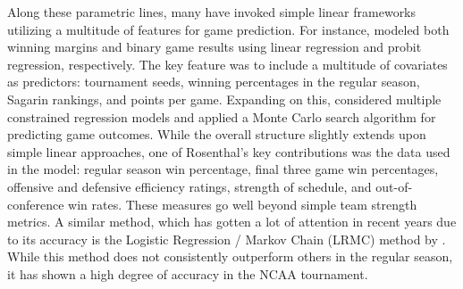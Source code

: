 \documentclass[letterpaper,12pt]{article}
\begin{document}
Along these parametric lines, many have invoked simple linear frameworks utilizing a multitude of features for game prediction. For instance, \cite{wright2012statistical} modeled both winning margins and binary game results using linear regression and probit regression, respectively. The key feature was to include a multitude of covariates as predictors: tournament seeds, winning percentages in the regular season, Sagarin rankings, and points per game. Expanding on this, \cite{rosenthal} considered multiple constrained regression models and applied a Monte Carlo search algorithm for predicting game outcomes. While the overall structure slightly extends upon simple linear approaches, one of Rosenthal's key contributions was the data used in the model: regular season win percentage, final three game win percentages, offensive and defensive efficiency ratings, strength of schedule, and out-of-conference win rates. These measures go well beyond simple team strength metrics. A similar method, which has gotten a lot of attention in recent years due to its accuracy is the Logistic Regression / Markov Chain (LRMC) method by \cite{Kvam2006}. While this method does not consistently outperform others in the regular season, it has shown a high degree of accuracy in the NCAA tournament.
\end{document}
